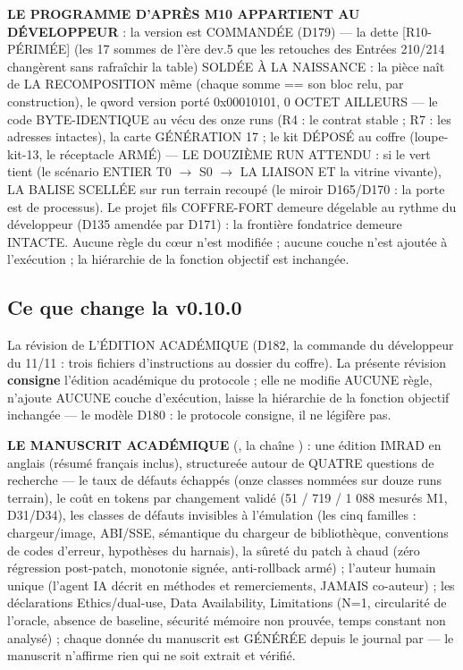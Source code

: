 \textbf{LE PROGRAMME D'APRÈS M10 APPARTIENT AU DÉVELOPPEUR} : la version
 est COMMANDÉE (D179) — la dette [R10-PÉRIMÉE] (les 17 sommes de
l'ère dev.5 que les retouches des Entrées 210/214 changèrent sans rafraîchir la
table) SOLDÉE À LA NAISSANCE : la pièce naît de LA RECOMPOSITION même (chaque
somme == son bloc relu, par construction), le qword version porté 0x00010101,
0 OCTET AILLEURS — le code BYTE-IDENTIQUE au vécu des onze runs (R4 : le contrat
stable ; R7 : les adresses intactes), la carte GÉNÉRATION 17 ; le kit
 DÉPOSÉ au coffre  (loupe-kit-13, le réceptacle
ARMÉ) — LE DOUZIÈME RUN ATTENDU : si le vert tient (le scénario ENTIER
T0 $\to$ S0 $\to$ LA LIAISON ET la vitrine vivante), LA BALISE
 SCELLÉE sur run terrain recoupé (le miroir D165/D170 : la porte
est de processus). Le projet fils COFFRE-FORT demeure dégelable au rythme du
développeur (D135 amendée par D171) : la frontière fondatrice demeure INTACTE.
Aucune règle du cœur n'est modifiée ; aucune couche n'est ajoutée à l'exécution ;
la hiérarchie de la fonction objectif est inchangée.

\subsection{Ce que change la v0.10.0}\label{sec:nouveautes100}

La révision de L'ÉDITION ACADÉMIQUE (D182, la commande du développeur du
11/11 : trois fichiers d'instructions au dossier  du
coffre). La présente révision \textbf{consigne} l'édition académique du
protocole ; elle ne modifie AUCUNE règle, n'ajoute AUCUNE couche
d'exécution, laisse la hiérarchie de la fonction objectif inchangée — le
modèle D180 : le protocole consigne, il ne légifère pas.

\textbf{LE MANUSCRIT ACADÉMIQUE} (,
la chaîne ) : une édition IMRAD en anglais
(résumé français inclus), structureée autour de QUATRE questions de
recherche — le taux de défauts échappés (onze classes nommées sur douze
runs terrain), le coût en tokens par changement validé (51 / 719 / 1 088
mesurés M1, D31/D34), les classes de défauts invisibles à l'émulation (les
cinq familles : chargeur/image, ABI/SSE, sémantique du chargeur de
bibliothèque, conventions de codes d'erreur, hypothèses du harnais), la
sûreté du patch à chaud (zéro régression post-patch, monotonie signée,
anti-rollback armé) ; l'auteur humain unique (l'agent IA décrit en
méthodes et remerciements, JAMAIS co-auteur) ; les déclarations
Ethics/dual-use, Data Availability, Limitations (N=1, circularité de
l'oracle, absence de baseline, sécurité mémoire non prouvée, temps
constant non analysé) ; chaque donnée du manuscrit est GÉNÉRÉE depuis le
journal par  — le manuscrit
n'affirme rien qui ne soit extrait et vérifié.

